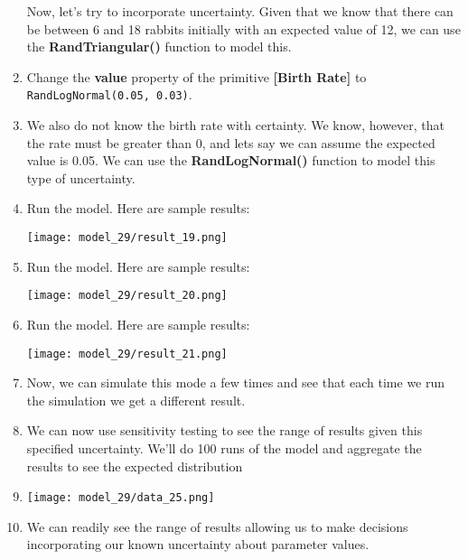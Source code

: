 \documentclass[]{memoir}
\makeatletter
\def\maxwidth{\ifdim\Gin@nat@width>\linewidth\linewidth
\else\Gin@nat@width\fi}
\let\Oldincludegraphics\includegraphics
\renewcommand{\includegraphics}[1]{\Oldincludegraphics[width=\maxwidth]{#1}}
\newcommand{\p}[1]{\textbf{{[}#1{]}}}
\newcommand{\e}[1]{\texttt{#1}}
\renewcommand{\a}[1]{\textbf{#1}}
\makeatother
\begin{document}
\begin{oframed}
\begin{enumerate}
Now, let's try to incorporate uncertainty. Given that we know that there can be between 6 and 18 rabbits initially with an expected value of 12, we can use the \textbf{RandTriangular()} function to model this.


\item  Change the \a{value} property of the primitive \p{Birth Rate} to \e{RandLogNormal(0.05, 0.03)}.
\item 

We also do not know the birth rate with certainty. We know, however, that the rate must be greater than 0, and lets say we can assume the expected value is 0.05. We can use the \textbf{RandLogNormal()} function to model this type of uncertainty.


\item Run the model. Here are sample results:\par \begin{minipage}{\linewidth}  \centering \texttt{[image: model\_29/result\_19.png]}
\end{minipage}
\item Run the model. Here are sample results:\par \begin{minipage}{\linewidth}  \centering \texttt{[image: model\_29/result\_20.png]}
\end{minipage}
\item Run the model. Here are sample results:\par \begin{minipage}{\linewidth}  \centering \texttt{[image: model\_29/result\_21.png]}
\end{minipage}
\item 

Now, we can simulate this mode a few times and see that each time we run the simulation we get a different result.


\item 

We can now use sensitivity testing to see the range of results given this specified uncertainty. We'll do 100 runs of the model and aggregate the results to see the expected distribution


\item \par \begin{minipage}{\linewidth}  \centering \texttt{[image: model\_29/data\_25.png]}
\end{minipage}
\item 

We can readily see the range of results allowing us to make decisions incorporating our known uncertainty about parameter values. 



\end{enumerate} \end{oframed}
\end{document}
